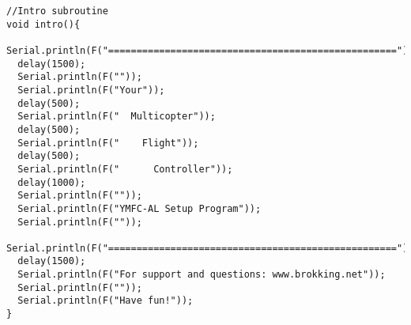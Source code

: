 \begin{lstlisting}
//Intro subroutine
void intro(){
  Serial.println(F("==================================================="));
  delay(1500);
  Serial.println(F(""));
  Serial.println(F("Your"));
  delay(500);
  Serial.println(F("  Multicopter"));
  delay(500);
  Serial.println(F("    Flight"));
  delay(500);
  Serial.println(F("      Controller"));
  delay(1000);
  Serial.println(F(""));
  Serial.println(F("YMFC-AL Setup Program"));
  Serial.println(F(""));
  Serial.println(F("==================================================="));
  delay(1500);
  Serial.println(F("For support and questions: www.brokking.net"));
  Serial.println(F(""));
  Serial.println(F("Have fun!"));
}

\end{lstlisting}